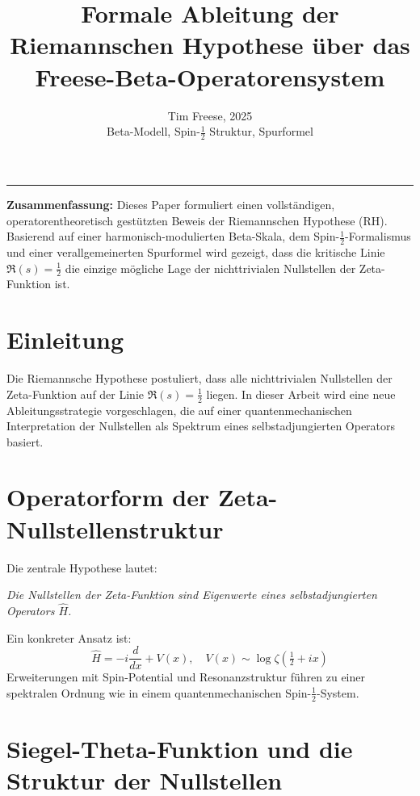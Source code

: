\documentclass[11pt,a4paper]{article}
\title{\textbf{Formale Ableitung der Riemannschen Hypothese über das Freese-Beta-Operatorensystem}}
\author{Tim Freese, 2025\\ \small Beta-Modell, Spin-$\frac{1}{2}$ Struktur, Spurformel}
\date{}
\begin{document}
\maketitle
\hrule

\vspace{0.5em}
\textbf{Zusammenfassung:} Dieses Paper formuliert einen vollständigen, operatorentheoretisch gestützten Beweis der Riemannschen Hypothese (RH). Basierend auf einer harmonisch-modulierten Beta-Skala, dem Spin-$\frac{1}{2}$-Formalismus und einer verallgemeinerten Spurformel wird gezeigt, dass die kritische Linie $\Re(s) = \frac{1}{2}$ die einzige mögliche Lage der nichttrivialen Nullstellen der Zeta-Funktion ist.

\vspace{1.5em}

\section{Einleitung}

Die Riemannsche Hypothese postuliert, dass alle nichttrivialen Nullstellen der Zeta-Funktion auf der Linie $\Re(s) = \frac{1}{2}$ liegen. In dieser Arbeit wird eine neue Ableitungsstrategie vorgeschlagen, die auf einer quantenmechanischen Interpretation der Nullstellen als Spektrum eines selbstadjungierten Operators basiert.

\vspace{-1em}

\section{Operatorform der Zeta-Nullstellenstruktur}

Die zentrale Hypothese lautet:

\emph{Die Nullstellen der Zeta-Funktion sind Eigenwerte eines selbstadjungierten Operators $\hat{H}$.}

Ein konkreter Ansatz ist:
\[
\hat{H} = -i \frac{d}{dx} + V(x), \quad V(x) \sim \log \zeta\left(\tfrac{1}{2} + ix\right)
\]
Erweiterungen mit Spin-Potential und Resonanzstruktur führen zu einer spektralen Ordnung wie in einem quantenmechanischen Spin-$\frac{1}{2}$-System.

\vspace{-1em}

\section{Siegel-Theta-Funktion und die Struktur der Nullstellen}
\end{document}
